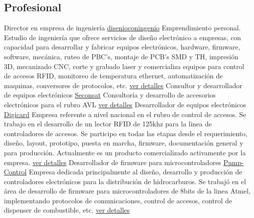 \documentclass[11pt,a4paper,sans]{moderncv}  %
\begin{document}
\subsection{Profesional}
    { Director en empresa de ingeniería}                 { \href { www.disenioconingenio.com.ar} { disenioconingenio}} { } { } { Emprendimiento personal. Estudio de ingeniería que ofrece servicios de diseño electrónico a empresas, con capacidad para desarrollar y fabricar equipos electrónicos, hardware, firmware, software, mecánica, ruteo de PBC's, montaje de PCB's SMD y TH, impresión 3D, mecanizado CNC, corte y grabado laser y comercializa equipos para control de accesos RFID, monitoreo de temperatura ethernet, automatización de maquinas, conversores de protocolos, etc. \href { http://disenioconingenio.com.ar/producto.php?products_id=398} { ver detalles}}
        { Consultor y desarrollador de equipos electrónicos} { \href { www.seconsat.com}             { Seconsat}}          { } { } { Consultoría y desarrollo de accesorios electrónicos para el rubro AVL \href                                                                                                                                                                                                                                                                                                                                                                                            { http://disenioconingenio.com.ar/producto.php?products_id=392} { ver detalles}}
        { Desarrollador de equipos electrónicos}             { \href { www.digicard.com.ar}          { Digicard}}          { } { } { Empresa referente a nivel nacional en el rubro de control de accesos. Se trabajo en el desarrollo de un lector RFID de 125khz para la linea de controladores de accesos. Se participo en todas las etapas desde el requerimiento, diseño, layout, prototipo, puesta en marcha, firmware, documentación general y para producción. Actualmente es un producto comercializado activamente por la empresa. \href                                                          { http://disenioconingenio.com.ar/producto.php?products_id=393} { ver detalles}}
        { Desarrollador de firmware para microcontroladores} { \href { www.pump-control.com.ar}      { Pump-Control}}      { } { } { Empresa dedicada principalmente al diseño, desarrollo y producción de controladores electrónicos para la distribución de hidrocarburos. Se trabajó en el área de desarrollo de firmware para microcontroladores de 8bits de la linea Atmel, implementando protocolos de comunicaciones, control de accesos, control de dispenser de combustible, etc. \href                                                                                                            { http://disenioconingenio.com.ar/producto.php?products_id=391} { ver detalles}}
\end{document}
